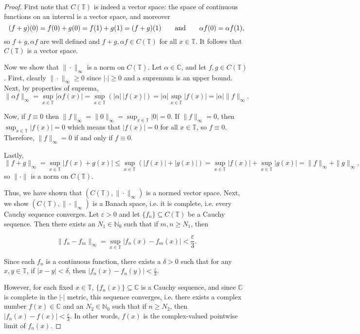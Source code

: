 \documentclass[11pt,oneside,english]{amsart}
\theoremstyle{definition}
\newcommand{\aspace}{\hspace{7mm}\text{and}\hspace{7mm}}
\newcommand{\ve}{\varepsilon}
\newcommand{\MB}[1]{\mathbb{#1}}
\begin{document}
\begin{enumerate}
\begin{proof}

First note that $C(\MB{T})$ is indeed a vector space: the space of continuous functions on an interval is a vector space, and moreover
\[
(f+g)(0)=f(0)+g(0)=f(1)+g(1)=(f+g)(1)\aspace \alpha f(0)=\alpha f(1),
\]
so $f+g,\alpha f$ are well defined and $f+g,\alpha f \in C(\MB{T})$ for all $x\in\MB{T}$. It follows that $C(\MB{T})$ is a vector space.

Now we show that $\|\cdot\|_\infty$ is a norm on $C(\MB{T})$. Let $\alpha\in \MB{C}$, and let $f,g\in C(\MB{T})$. First, clearly $\|\cdot\|_\infty\geq0$ since $|\cdot|\geq0$ and a supremum is an upper bound. Next, by properties of suprema,
\[
\|\alpha f\|_\infty=\sup_{x\in\MB{T}}|\alpha f(x)|=\sup_{x\in\MB{T}}\left(|\alpha|\,|f(x)|\right)=|\alpha|\sup_{x\in\MB{T}}|f(x)|=|\alpha|\|f\|_\infty.
\]

Now, if $f\equiv0$ then $\|f\|_\infty=\|0\|_\infty=\sup_{x\in\MB{T}}|0|=0$. If $\|f\|_\infty=0$, then $\sup_{x\in\MB{T}}|f(x)|=0$ which means that $|f(x)|=0$ for all $x\in\MB{T}$, so $f\equiv0$. Therefore, $\|f\|_\infty=0$ if and only if $f\equiv 0$.

Lastly,
\[
\|f+g\|_\infty=\sup_{x\in\MB{T}}\left|f(x)+g(x)\right|\leq\sup_{x\in\MB{T}}(|f(x)|+|g(x)|)=\sup_{x\in\MB{T}}|f(x)|+\sup_{x\in\MB{T}}|g(x)|=\|f\|_\infty+\|g\|_\infty,
\]
so $\|\cdot\|$ is a norm on $C(\MB{T})$. 

Thus, we have shown that  $(C(\MB{T}),\|\cdot\|_\infty)$ is a normed vector space. Next, we show $(C(\MB{T}),\|\cdot\|_\infty)$ is a Banach space, i.e. it is complete, i.e. every Cauchy sequence converges. Let $\ve>0$ and let $\{f_n\}\subseteq C(\MB{T})$ be a Cauchy sequence. Then there exists an $N_1\in\MB{N}_0$ such that if $m,n\geq N_1$, then

\[
\|f_n-f_m\|_\infty=\sup_{x\in\MB{T}}|f_n(x)-f_m(x)|<\frac{\ve}{3}.
\]

Since each $f_n$ is a continuous function, there exists a $\delta>0$ such that for any $x,y\in\MB{T}$, if $|x-y|<\delta$, then $|f_n(x)-f_n(y)|<\frac{\ve}{3}$. 

However, for each fixed $x\in\MB{T}$, $\{f_n(x)\}\subseteq \MB{C}$ is a Cauchy sequence, and since $\MB{C}$ is complete in the $|\cdot|$ metric, this sequence converges, i.e. there exists a complex number $f(x)\in\MB{C}$ and an $N_2\in\MB{N}_0$ such that if $n\geq N_2$, then $|f_n(x)-f(x)|<\frac{\ve}{3}$. In other words, $f(x)$ is the complex-valued pointwise limit of $f_n(x)$.


\end{proof}
\end{enumerate}
\end{document}
